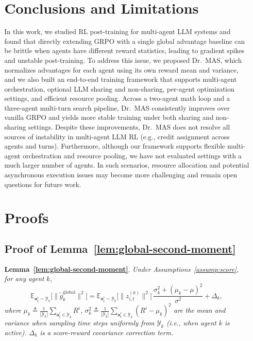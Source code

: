 \documentclass[]{fairmeta}
\theoremstyle{plain}
\theoremstyle{definition}
\theoremstyle{remark}
\newcommand{\methodname}{Dr.\ MAS}
\begin{document}
\section{Conclusions and Limitations}
In this work, we studied RL post-training for multi-agent LLM systems and found that directly extending GRPO with a single global advantage baseline can be brittle when agents have different reward statistics, leading to gradient spikes and unstable post-training. To address this issue, we proposed \methodname{}, which normalizes advantages for each agent using its own reward mean and variance, and we also built an end-to-end training framework that supports multi-agent orchestration, optional LLM sharing and non-sharing, per-agent optimization settings, and efficient resource pooling. Across a two-agent math loop and a three-agent multi-turn search pipeline, \methodname{} consistently improves over vanilla GRPO and yields more stable training under both sharing and non-sharing settings. Despite these improvements, \methodname{} does not resolve all sources of instability in multi-agent LLM RL (e.g., credit assignment across agents and turns). Furthermore, although our framework supports flexible multi-agent orchestration and resource pooling, we have not evaluated settings with a much larger number of agents. In such scenarios, resource allocation and potential asynchronous execution issues may become more challenging and remain open questions for future work.
{\small


}
\appendix

\section{Proofs}
\label{app:proofs}  
\subsection{Proof of Lemma~\ref{lem:global-second-moment}}
\label{app:proof_lemma_global_second_moment}

\textbf{Lemma~\ref{lem:global-second-moment}}.
\textit{
Under Assumptions~\ref{assump:score}, for any agent $k$,
\begin{equation}
\nonumber
\mathbb{E}_{\bm{a}_t^i\sim \mathcal{Y}_k}\big[\|\tilde{g}_k^{\mathrm{global}}\|^2\big]
{=} \mathbb{E}_{\bm{a}_t^i\sim \mathcal{Y}_k}\big[\|z_{i,t}^{(k)}\|^2\big]\,
  \frac{\sigma_k^2 + (\mu_k - \mu)^2}{\sigma^2} + \Delta_k,
\end{equation}
where $\mu_k \triangleq \frac{1}{|\mathcal{Y}_k|}\sum_{\bm{a}_t^i\in \mathcal{Y}_k} R^i$, $\sigma_k^2 \triangleq \frac{1}{|\mathcal{Y}_k|}\sum_{\bm{a}_t^i\in \mathcal{Y}_k} (R^i - \mu_k)^2$
are the mean and variance when sampling
time steps uniformly from $\mathcal{Y}_k$ (i.e., when agent $k$ is active). $\Delta_k$ is a score-reward covariance correction term.
}
\end{document}
